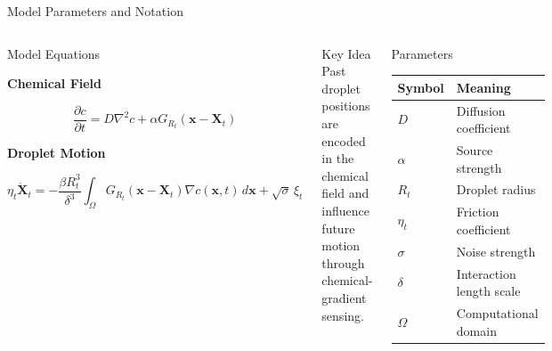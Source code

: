 \begin{frame}{Model Parameters and Notation}
	\vspace{-0.2cm}

	\begin{columns}[T]


		\begin{block}{Model Equations}

			\textbf{Chemical Field}

			\[
				\frac{\partial c}{\partial t}
				=
				D\nabla^2 c
				+
				\alpha G_{R_t}(\mathbf{x}-\mathbf{X}_t)
			\]

			\vspace{0.2cm}

			\textbf{Droplet Motion}
			\vspace{-0.4cm}

			\[
				\eta_t \dot{\mathbf X}_t
				=
				-
				\frac{\beta R_t^3}{\delta^3}
				\int_{\Omega}
				G_{R_t}(\mathbf{x}-\mathbf X_t)
				\nabla c(\mathbf{x},t)\,d\mathbf x
				+
				\sqrt{\sigma}\,\xi_t
			\]

		\end{block}

		\begin{alertblock}{Key Idea}
			Past droplet positions are encoded in the chemical field and influence future motion through chemical-gradient sensing.
		\end{alertblock}


		\begin{block}{Parameters}

			\centering

			\small

			\begin{tabular}{ll}
				\hline
				\textbf{Symbol} & \textbf{Meaning}         \\
				\hline
				$D$             & Diffusion coefficient    \\
				$\alpha$        & Source strength          \\
				$R_t$           & Droplet radius           \\
				$\eta_t$        & Friction coefficient     \\
				$\sigma$        & Noise strength           \\
				$\delta$        & Interaction length scale \\
				$\Omega$        & Computational domain     \\
				\hline
			\end{tabular}

		\end{block}

		\vspace{0.2cm}

	\end{columns}
\end{frame}
